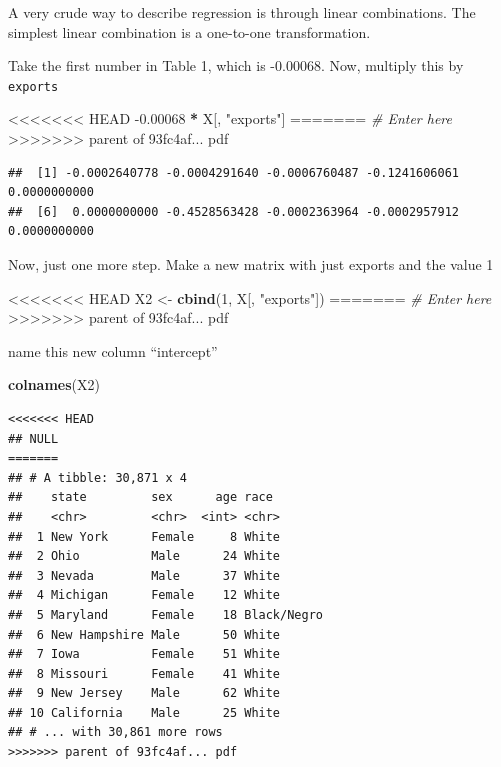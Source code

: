 \documentclass[]{book}
\newenvironment{Shaded}{\begin{snugshade}}{\end{snugshade}}
\newcommand{\CommentTok}[1]{\textcolor[rgb]{0.56,0.35,0.01}{\textit{#1}}}
\newcommand{\DecValTok}[1]{\textcolor[rgb]{0.00,0.00,0.81}{#1}}
\newcommand{\FloatTok}[1]{\textcolor[rgb]{0.00,0.00,0.81}{#1}}
\newcommand{\KeywordTok}[1]{\textcolor[rgb]{0.13,0.29,0.53}{\textbf{#1}}}
\newcommand{\NormalTok}[1]{#1}
\newcommand{\OperatorTok}[1]{\textcolor[rgb]{0.81,0.36,0.00}{\textbf{#1}}}
\newcommand{\StringTok}[1]{\textcolor[rgb]{0.31,0.60,0.02}{#1}}
\theoremstyle{definition}
\theoremstyle{definition}
\theoremstyle{definition}
\theoremstyle{remark}
\begin{document}
\begin{Shaded}
\begin{Highlighting}[]
\begin{Shaded}
\begin{Highlighting}[]
A very crude way to describe regression is through linear combinations. The simplest linear combination is a one-to-one transformation.

Take the first number in Table 1, which is -0.00068. Now, multiply this by \texttt{exports}

\begin{Shaded}
\begin{Highlighting}[]
<<<<<<< HEAD
\FloatTok{{-}0.00068} \OperatorTok{*}\StringTok{ }\NormalTok{X[, }\StringTok{"exports"}\NormalTok{]}
=======
\CommentTok{# Enter here}
>>>>>>> parent of 93fc4af... pdf
\end{Highlighting}
\end{Shaded}

\begin{verbatim}
##  [1] -0.0002640778 -0.0004291640 -0.0006760487 -0.1241606061  0.0000000000
##  [6]  0.0000000000 -0.4528563428 -0.0002363964 -0.0002957912  0.0000000000
\end{verbatim}

Now, just one more step. Make a new matrix with just exports and the value 1

\begin{Shaded}
\begin{Highlighting}[]
<<<<<<< HEAD
\NormalTok{X2 <{-}}\StringTok{ }\KeywordTok{cbind}\NormalTok{(}\DecValTok{1}\NormalTok{, X[, }\StringTok{"exports"}\NormalTok{])}
=======
\CommentTok{# Enter here}
>>>>>>> parent of 93fc4af... pdf
\end{Highlighting}
\end{Shaded}

name this new column ``intercept''

\begin{Shaded}
\begin{Highlighting}[]
\KeywordTok{colnames}\NormalTok{(X2)}
\end{Highlighting}
\end{Shaded}

\begin{verbatim}
<<<<<<< HEAD
## NULL
=======
## # A tibble: 30,871 x 4
##    state         sex      age race       
##    <chr>         <chr>  <int> <chr>      
##  1 New York      Female     8 White      
##  2 Ohio          Male      24 White      
##  3 Nevada        Male      37 White      
##  4 Michigan      Female    12 White      
##  5 Maryland      Female    18 Black/Negro
##  6 New Hampshire Male      50 White      
##  7 Iowa          Female    51 White      
##  8 Missouri      Female    41 White      
##  9 New Jersey    Male      62 White      
## 10 California    Male      25 White      
## # ... with 30,861 more rows
>>>>>>> parent of 93fc4af... pdf
\end{verbatim}


\end{Highlighting}
\end{Shaded}
\end{Highlighting}
\end{Shaded}
\end{document}
